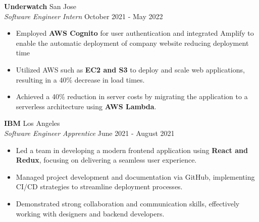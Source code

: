 \documentclass[a4paper,10pt]{article}
\begin{document}
\vspace{3mm}

\noindent \textbf{Underwatch} \hfill {San Jose}\\
\textit{Software Engineer Intern} \hfill {October 2021 - May 2022}\vspace{-\baselineskip}
\vspace{2.5mm}
\begin{itemize}
    \item Employed \textbf{AWS Cognito} for user authentication and integrated Amplify to enable the automatic deployment of company website reducing deployment time \vspace{0.3ex}
    \item Utilized AWS such as \textbf{EC2 and S3} to deploy and scale web applications, resulting in a 40\% decrease in load times.\vspace{0.3ex}
    \item Achieved a 40\% reduction in server costs by migrating the application to a serverless architecture using \textbf{AWS Lambda}.
    \vspace{0.3ex}
\end{itemize}

\vspace{3mm}

\noindent \textbf{IBM} \hfill {Los Angeles}\\
\textit{Software Engineer Apprentice} \hfill {June 2021 - August 2021}\vspace{-\baselineskip}
\vspace{2.5mm}
\begin{itemize}
    \item Led a team in developing a modern frontend application using \textbf{React and Redux}, focusing on delivering a seamless user experience.\vspace{0.3ex}
    \item Managed project development and documentation via GitHub, implementing CI/CD strategies to streamline deployment processes.\vspace{0.3ex}
    \item Demonstrated strong collaboration and communication skills, effectively working with designers and backend developers.\vspace{0.3ex}
\end{itemize}

\vspace{3mm}
\end{document}
